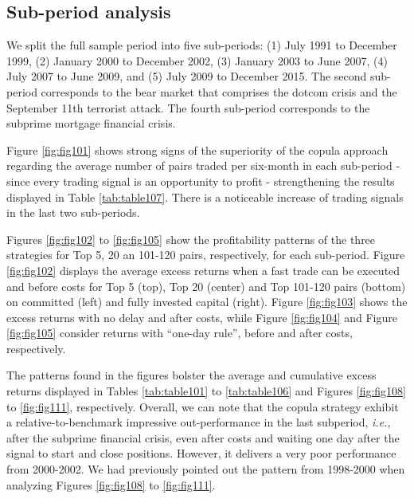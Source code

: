 \documentclass[a4paper]{article}
\begin{document}
	\medskip
	
	\subsection{Sub-period analysis}
	
	We split the full sample period into five sub-periods: (1) July 1991 to December 1999, (2) January 2000 to December 2002, (3) January 2003 to June 2007, (4) July 2007 to June 2009, and (5) July 2009 to December 2015. The second sub-period corresponds to the bear market that comprises the dotcom crisis and the September 11th terrorist attack. The fourth sub-period corresponds to the subprime mortgage financial crisis.
	
	Figure \ref{fig:fig101} shows strong signs of the superiority of the copula approach regarding the average number of pairs traded per six-month in each sub-period - since every trading signal is an opportunity to profit - strengthening the results displayed in Table \ref{tab:table107}. There is a noticeable increase of trading signals in the last two sub-periods.
	
	

	Figures \ref{fig:fig102} to \ref{fig:fig105} show the profitability patterns of the three strategies for Top 5, 20 an 101-120 pairs, respectively, for each sub-period. Figure \ref{fig:fig102} displays the average excess returns when a fast trade can be executed and before costs for Top 5 (top), Top 20 (center) and Top 101-120 pairs (bottom) on committed (left) and fully invested capital (right). Figure \ref{fig:fig103} shows the excess returns with no delay and after costs, while Figure \ref{fig:fig104} and Figure \ref{fig:fig105} consider returns with “one-day rule”, before and after costs, respectively.
	
	The patterns found in the figures bolster the average and cumulative excess returns displayed in Tables \ref{tab:table101} to \ref{tab:table106} and Figures \ref{fig:fig108} to \ref{fig:fig111}, respectively. Overall, we can note that the copula strategy exhibit a relative-to-benchmark impressive out-performance in the last subperiod, \emph{i.e.}, after the subprime financial crisis, even after costs and waiting one day after the signal to start and close positions. However, it delivers a very poor performance from 2000-2002. We had previously pointed out the pattern from 1998-2000 when analyzing Figures \ref{fig:fig108} to \ref{fig:fig111}.
	
\end{document}
